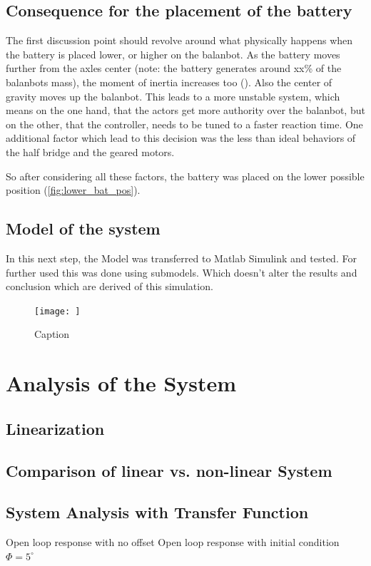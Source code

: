 \subsection{Consequence for the placement of the battery}
The first discussion point should revolve around what physically happens when the battery is placed lower, or higher on the balanbot. As the battery moves further from the axles center (note: the battery generates around xx\% of the balanbots mass), the moment of inertia increases too (\cite{enwiki:satz_von_steiner}). Also the center of gravity moves up the balanbot. This leads to a more unstable system, which means on the one hand, that the actors get more authority over the balanbot, but on the other, that the controller, needs to be tuned to a faster reaction time. One additional factor which lead to this decision was the less than ideal behaviors of the half bridge and the geared motors. 

So after considering all these factors, the battery was placed on the lower possible position (\autoref{fig:lower_bat_pos}).

\subsection{Model of the system}
In this next step, the Model was transferred to Matlab Simulink and tested. For further used this was done using submodels. Which doesn't alter the results and conclusion which are derived of this simulation.
\begin{figure}[H]
    \centering
    \texttt{[image: ]}
    \caption{Caption}
    \label{fig:my_label}
\end{figure}
\section{Analysis of the System}

\subsection{Linearization}



\subsection{Comparison of linear vs. non-linear System}

\subsection{System Analysis with Transfer Function}

Open loop response with no offset
Open loop response with initial condition $\Phi = 5^\circ$